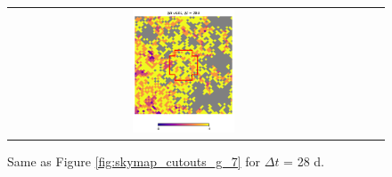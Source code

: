 \documentclass[preprintm,linenumbers]{aastex631}
\begin{document}
\begin{figure}
\begin{tabular}{  c c c}
				\includegraphics[width=0.3\textwidth]{results/skymaps_cutout/skymaps_cutout_delta_first_year_one_snap_v4_0_10yrs_db_noDD_noTwi_tscale-28_nside-256_doAllTemplateMetrics_reduceCount_g_GP_noDD_noTwi.pdf} \\
			\end{tabular}
			\caption{
   Same as Figure \ref{fig:skymap_cutouts_g_7} for $\Delta t$ = 28 d. 
    }
	\label{fig:skymap_cutouts_g_28}
		\end{figure}
\end{document}
